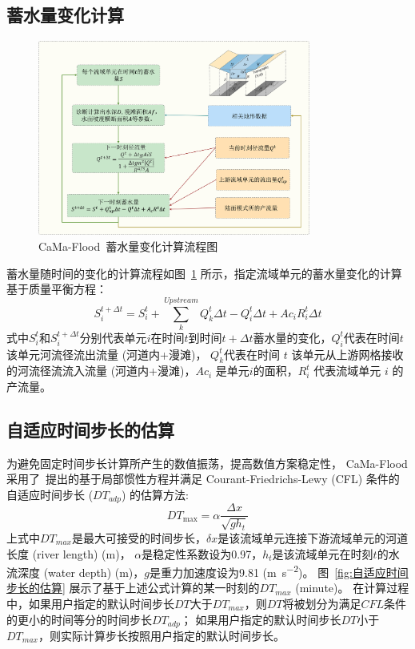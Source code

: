 \subsection{蓄水量变化计算}
{
\begin{figure}[htbp]
\centering
\includegraphics[width=0.8\textwidth]{Figures/陆地表面的水分循环/蓄水量变化计算流程图.png}
\caption{CaMa-Flood~蓄水量变化计算流程图 }
\label{fig:蓄水量变化计算流程图}
\end{figure}
}
蓄水量随时间的变化的计算流程如图~\ref{fig:蓄水量变化计算流程图} 所示，指定流域单元的蓄水量变化的计算基于质量平衡方程：
\begin{equation}
S_{i}^{t+\Delta t}=S_{i}^{t}+\sum_{k}^{Upstream} Q_{k}^{t} \Delta t-Q_{i}^{t} \Delta t+A c_{i} R_{i}^{t} \Delta t
\end{equation}
式中$S_{i}^{t}$和$S_{i}^{t+\Delta t}$分别代表单元$i$在时间$t$到时间$t+\Delta t$蓄水量的变化，$Q_i^t$代表在时间$t$该单元河流径流出流量 (河道内+漫滩)，
$Q_k^t$代表在时间 $t$ 该单元从上游网格接收的河流径流流入流量 (河道内+漫滩)，$Ac_i$ 是单元$i$的面积，$R_i^t$ 代表流域单元 $i$ 的产流量。


\subsection{自适应时间步长的估算}
为避免固定时间步长计算所产生的数值振荡，提高数值方案稳定性，
CaMa-Flood 采用了~\citet{bates2010}提出的基于局部惯性方程并满足 Courant-Friedrichs-Lewy (CFL) 
条件的自适应时间步长 ($DT_{adp}$) 的估算方法:
\begin{equation}
{DT}_{\max }={\alpha} \frac{\Delta x}{\sqrt{g h_{t}}}
\end{equation}
上式中$DT_{max}$是最大可接受的时间步长，$\delta{x}$是该流域单元连接下游流域单元的河道长度 (river length) (\unit{m})，
$\alpha$是稳定性系数设为0.97，$h_t$是该流域单元在时刻$t$的水流深度 (water depth) (\unit{m})，$g$是重力加速度设为9.81 (\unit{m.s^{-2}})。
图~\ref{fig:自适应时间步长的估算} 展示了基于上述公式计算的某一时刻的$DT_{max}$ (minute)。
在计算过程中，如果用户指定的默认时间步长$DT$大于$DT_{max}$，则$DT$将被划分为满足$CFL$条件的更小的时间等分的时间步长$DT_{adp}$；
如果用户指定的默认时间步长$DT$小于$DT_{max}$，则实际计算步长按照用户指定的默认时间步长。

